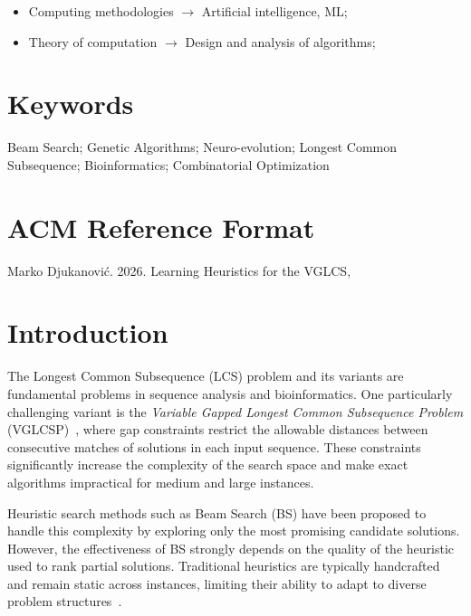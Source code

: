 \documentclass{sigplanconf}
\begin{document}
	\begin{itemize}
		\item Computing methodologies $\rightarrow$ Artificial intelligence, ML;
		\item Theory of computation $\rightarrow$ Design and analysis of algorithms;
	\end{itemize}
	
	\section*{Keywords}
	
	Beam Search; Genetic Algorithms; Neuro-evolution; Longest Common Subsequence; Bioinformatics; Combinatorial Optimization
	
	\section*{ACM Reference Format}
	
	Marko Djukanović. 2026. 
	Learning Heuristics for the  VGLCS,%
	
	\section{Introduction}
	
	The Longest Common Subsequence (LCS) problem and its variants are fundamental problems in sequence analysis and bioinformatics. 
	One particularly challenging variant is the \textit{Variable Gapped Longest Common Subsequence Problem} (VGLCSP)~\cite{penga2011longest}, where gap constraints restrict the allowable distances between consecutive matches of solutions in each input sequence. 
	These constraints significantly increase the complexity of the search space and make exact algorithms impractical for medium and large instances.
	
	Heuristic search methods such as Beam Search (BS) have been proposed to handle this complexity by exploring only the most promising candidate solutions. 
	However, the effectiveness of BS strongly depends on the quality of the heuristic used to rank partial solutions.	Traditional heuristics are typically handcrafted and remain static across instances, limiting their ability to adapt to diverse problem structures~\cite{djukanovic_eurocast_2026}.
	
\end{document}
